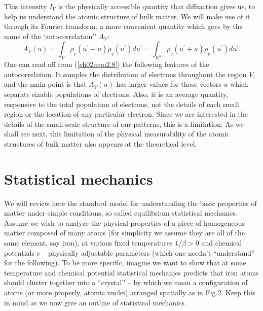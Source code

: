 \documentclass[reqno]{stml-l}
\theoremstyle{plain}
\theoremstyle{definition}
\numberwithin{equation}{chapter}
\begin{document}
This intensity $I_{V}$ is the physically accessible quantity that diffraction gives us, to help us understand the atomic structure of bulk matter. We will make use of it through its Fourier transform, a more convenient quantity which goes by the name of the `autocorrelation'' $A_{V}$:
\begin{equation}
A_{V}(u)= \int_{V}\rho_{_{V}}(u^{\prime}+u)\rho_{_{V}}(u^{\prime})du^{\prime}=\int_{\mathbb{R}^{3}}\rho_{_{V}}(u^{\prime}+u)\rho_{_{V}}(u^{\prime})du^{\prime}.\label{ch02:eqn2.8} \end{equation}
One can read off from (\ref{ch02:eqn2.8}) the following features of the autocorrelation. It samples the distribution of electrons throughout the region $V$, and the main point is that $A_{V}(u)$ has larger values for those vectors $u$ which separate sizable populations of electrons. Also, it is an average quantity, responsive to the total population of electrons, not the details of each small region or the location of any particular electron. Since we are interested in the details of the small-scale structure of our patterns, this is a limitation. As we shall see next, this limitation of the physical measurability of the atomic structures of bulk matter also appears at the theoretical level.

\section{Statistical mechanics}\label{ch02:sec2}

We will review here the standard model for understanding the basic properties of matter under simple conditions, so called equilibrium statistical mechanics. Assume we wish to analyze the physical properties of a piece of homogeneous matter composed of many atoms (for simplicity we assume they are all of the same element, say iron), at various fixed temperatures $1/\beta>0$ and chemical potentials $c$ -- physically adjustable parameters (which one needn't ``understand'' for the following). To be more specific, imagine we want to show that at some temperature and chemical potential statistical mechanics predicts that iron atoms should cluster together into a ``crystal'' -- by which we mean a configuration of atoms (or more properly, atomic nuclei) arranged spatially as in Fig.2. Keep this in mind as we now give an outline of statistical mechanics.
\end{document}

